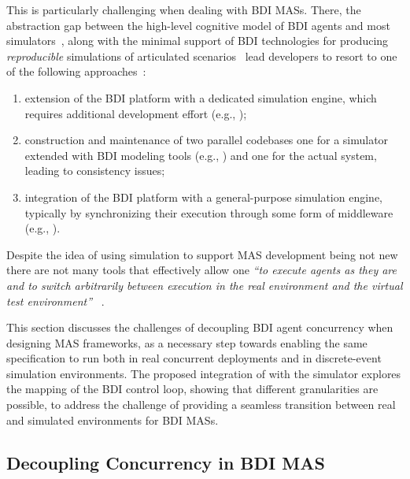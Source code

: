 This is particularly challenging when dealing with \ac{BDI} \acp{MAS}.
There,
the abstraction gap between the high-level cognitive model of \ac{BDI} agents and most simulators~\cite{singh_integrating_2016},
along with the minimal support of \ac{BDI} technologies
for producing \emph{reproducible} simulations of articulated scenarios~\cite{kehoe2016robust}
lead developers to resort to one of the following approaches~\cite{singh_integrating_2016}:
%
\begin{enumerate}
    \item extension of the \ac{BDI} platform with a dedicated simulation engine,
    which requires additional development effort (e.g., \cite{HubnerB09,ricci_exploiting_2020});
    \item construction and maintenance of two parallel codebases
    one for a simulator extended with \ac{BDI} modeling tools (e.g., \cite{sakellariou_enhancing_2008,TaillandierBCAG16,uhrmacher1998agents}) and one for the actual system,
    leading to consistency issues;
    \item integration of the \ac{BDI} platform with a general-purpose simulation engine,
    typically by synchronizing their execution through some form of middleware (e.g., \cite{singh_integrating_2016,davoust_architecture_2020}).
\end{enumerate}

Despite the idea of using simulation to support \ac{MAS} development being not new
there are not many tools that effectively allow one
\emph{
    ``to execute agents as they are and to switch arbitrarily between execution in the real environment and the virtual test environment''
}~\cite{uhrmacher_simulation_2002}.

This section discusses the challenges of decoupling \ac{BDI} agent concurrency when designing \ac{MAS} frameworks, as a necessary step towards enabling the same specification to run both in real concurrent deployments and in discrete-event simulation environments.
%
The proposed integration of \jakta{} with the \alchemist{} simulator explores the mapping of the \ac{BDI} control loop, showing that different granularities are possible, to address the challenge of providing a seamless transition between real and simulated environments for \ac{BDI} \acp{MAS}.

\subsection{Decoupling Concurrency in BDI MAS}
\label{ssec:mas:engineering:concurrency}

